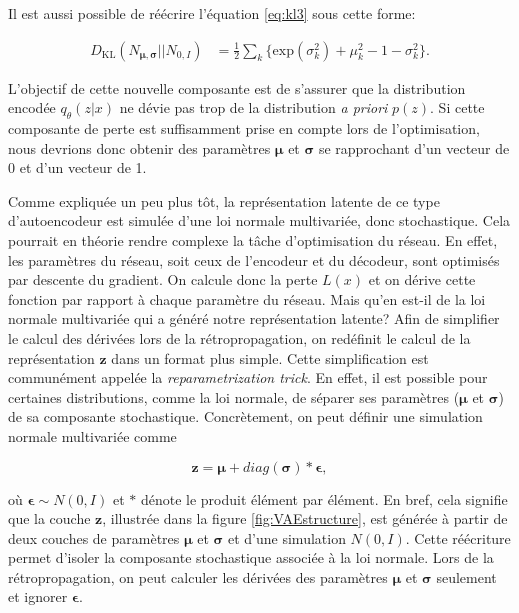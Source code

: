 Il est aussi possible de réécrire l'équation \ref{eq:kl3} sous cette forme:

\begin{equation}  \label{eq:kl4}
\begin{aligned}
D_{\text{KL}}(N_{\boldsymbol \mu, \boldsymbol \sigma} || N_{0,I}) &= \frac{1}{2} \sum_{k}\Big\{\text{exp}(\sigma_{k}^2) + \mu_{k}^2 - 1 - \sigma_{k}^2\Big\}.
\end{aligned}
\end{equation}


 L'objectif de cette nouvelle composante est de s'assurer que la distribution encodée $q_{\theta}(z|x)$ ne dévie pas trop de la distribution \textit{a priori} $p(z)$. Si cette composante de perte est suffisamment prise en compte lors de l'optimisation, nous devrions donc obtenir des paramètres $\boldsymbol{\mu}$ et $\boldsymbol{\sigma}$ se rapprochant d'un vecteur de 0 et d'un vecteur de 1.

Comme expliquée un peu plus tôt, la représentation latente de ce type d'autoencodeur est simulée d'une loi normale multivariée, donc stochastique. Cela pourrait en théorie rendre complexe la tâche d'optimisation du réseau. En effet, les paramètres du réseau, soit ceux de l'encodeur et du décodeur, sont optimisés par descente du gradient. On calcule donc la perte $L(x)$ et on dérive cette fonction par rapport à chaque paramètre du réseau. Mais qu'en est-il de la loi normale multivariée qui a généré notre représentation latente? Afin de simplifier le calcul des dérivées lors de la rétropropagation, on redéfinit le calcul de la représentation $\boldsymbol{z}$ dans un format plus simple. Cette simplification est communément appelée la  \textit{reparametrization trick}. En effet, il est possible pour certaines distributions, comme la loi normale, de séparer ses paramètres ($\boldsymbol{\mu}$ et $\boldsymbol{\sigma}$)  de sa composante stochastique. Concrètement, on peut définir une simulation normale multivariée comme

\begin{equation} \label{eq:latent_formula}
\boldsymbol{z} = \boldsymbol{\mu} + diag(\boldsymbol{\sigma}) *\boldsymbol{\epsilon},
\end{equation}

où $\boldsymbol{\epsilon} \sim N(0,I)$ et $*$ dénote le produit élément par élément. En bref, cela signifie que la couche $\boldsymbol{z}$, illustrée dans la figure \ref{fig:VAEstructure}, est générée à partir de deux couches de paramètres $\boldsymbol{\mu}$ et $\boldsymbol{\sigma}$ et d'une simulation $N(0,I)$. Cette réécriture permet d'isoler la composante stochastique associée à la loi normale. Lors de la rétropropagation, on peut calculer les dérivées des paramètres $\boldsymbol{\mu}$ et $\boldsymbol{\sigma}$ seulement et ignorer $\boldsymbol{\epsilon}$. 

